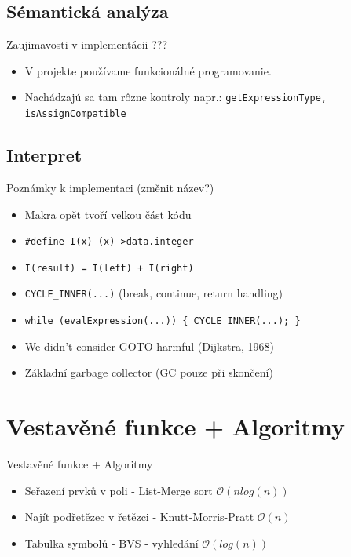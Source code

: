 \documentclass[13pt]{beamer}
\begin{document}
\subsection{Sémantická analýza}

\begin{frame}{Zaujimavosti v implementácii ???}
  \begin{itemize}
    \item V projekte používame funkcionálné programovanie.
    \item Nachádzajú sa tam rôzne kontroly napr.: \texttt{getExpressionType, isAssignCompatible}
  \end{itemize}
\end{frame}

\subsection{Interpret}

\begin{frame}{Poznámky k implementaci (změnit název?)}


  \begin{itemize}
    \item Makra opět tvoří velkou část kódu
    \item \texttt{\#define I(x) (x)->data.integer}
    \item \texttt{I(result) = I(left) + I(right)}
    \item \texttt{CYCLE\_INNER(...)} (break, continue, return handling)
    \item \texttt{while (evalExpression(...)) \{ CYCLE\_INNER(...); \}}
    \item We didn't consider GOTO harmful (Dijkstra, 1968)
    \item Základní garbage collector (GC pouze při skončení)
  \end{itemize}

\end{frame}

\section{Vestavěné funkce + Algoritmy}

\begin{frame}{Vestavěné funkce + Algoritmy}

  \begin{itemize}
    \item Seřazení prvků v poli - List-Merge sort $\mathcal{O}(n log(n))$
    \item Najít podřetězec v řetězci - Knutt-Morris-Pratt $\mathcal{O}(n)$
    \item Tabulka symbolů - BVS - vyhledání $\mathcal{O}(log (n))$
  \end{itemize}
\end{frame}
\end{document}
